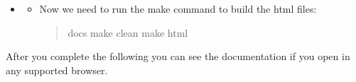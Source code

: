 \documentclass[letterpaper,10pt,english]{sphinxmanual}
\begin{document}
\begin{itemize}
\item {} \begin{description}
\begin{itemize}
\item {} 
\sphinxAtStartPar
Now we need to run the make command to build the html files:
\begin{quote}

\begin{sphinxVerbatim}[commandchars=\\\{\}]
 docs
make clean  
make html
\end{sphinxVerbatim}
\end{quote}

\end{itemize}

\end{description}

\end{itemize}

\sphinxAtStartPar
After you complete the following you can see the documentation if you open  in any supported browser.
\end{document}

